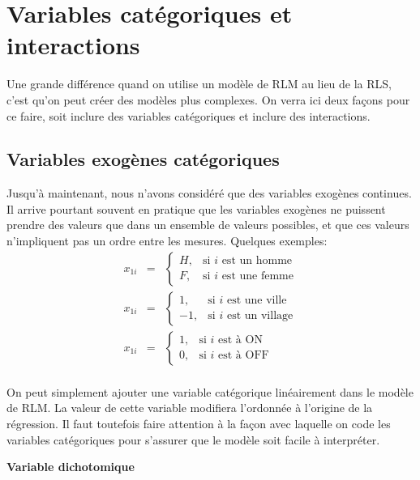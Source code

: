 
\chapter{Variables catégoriques et interactions}
\label{sec:CategoriquesInteractions}

Une grande différence quand on utilise un modèle de RLM au lieu de la RLS, c'est qu'on peut créer des modèles plus complexes. On verra ici deux façons pour ce faire, soit inclure des variables catégoriques et inclure des interactions.

\section{Variables exogènes catégoriques}

Jusqu'à maintenant, nous n'avons considéré que des variables
exogènes continues. Il arrive pourtant souvent en pratique que
les variables exogènes ne puissent prendre des valeurs que dans
un ensemble de valeurs possibles, et que ces valeurs n'impliquent
pas un ordre entre les mesures. Quelques exemples:
\begin{eqnarray*}
x_{1i}&=&\left\{\begin{array}{ll} H, & \mbox{si $i$ est un homme}\\
F, & \mbox{si $i$ est une femme}\end{array}\right.\\
x_{1i}&=&\left\{\begin{array}{ll} 1, & \mbox{si $i$ est une ville}\\
-1, & \mbox{si $i$ est un village}\end{array}\right.\\
x_{1i}&=&\left\{\begin{array}{ll}1, & \mbox{si $i$ est à ON}\\
0, & \mbox{si $i$ est à OFF}\end{array}\right.\\
\end{eqnarray*}

On peut simplement ajouter une variable catégorique linéairement dans le modèle de RLM. La valeur de cette variable modifiera l'ordonnée à l'origine de la régression. Il faut toutefois faire attention à la façon avec laquelle on code les variables catégoriques pour s'assurer que le modèle soit facile à interpréter.

\newpage
\textbf{Variable dichotomique}

